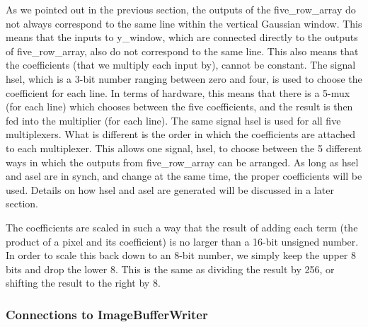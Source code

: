 \documentclass[12pt]{article}
\begin{document}
As we pointed out in the previous section, the outputs of the five\_row\_array do 
not always correspond to the same line within the vertical Gaussian window. This 
means that the inputs to y\_window, which are connected directly to the outputs 
of five\_row\_array, also do not correspond to the same line. This also means that 
the coefficients (that we multiply each input by), cannot be constant. The 
signal hsel, which is a 3-bit number ranging between zero and four, is used to 
choose the coefficient for each line. In terms of hardware, this means that 
there is a 5-mux (for each line) which chooses between the five coefficients, 
and the result is then fed into the multiplier (for each line). The same signal 
hsel is used for all five multiplexers. What is different is the order in which 
the coefficients are attached to each multiplexer. This allows one signal, hsel, 
to choose between the 5 different ways in which the outputs from five\_row\_array 
can be arranged. As long as hsel and asel are in synch, and change at the same 
time, the proper coefficients will be used. Details on how hsel and asel are 
generated will be discussed in a later section.

The coefficients are scaled in such a way that the result of adding each term 
(the product of a pixel and its coefficient) is no larger than a 16-bit unsigned 
number. In order to scale this back down to an 8-bit number, we simply keep the 
upper 8 bits and drop the lower 8. This is the same as dividing the result by 
256, or shifting the result to the right by 8.


\subsubsection{Connections to ImageBufferWriter}
\end{document}
